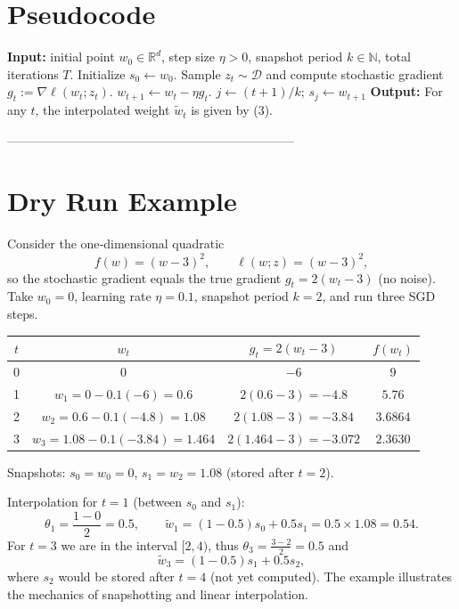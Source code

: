 \documentclass{article}
\newcommand{\R}{\mathbb{R}}
\begin{document}
\section*{Pseudocode}
\begin{algorithm}[H]
\caption{Stochastic Weight Interpolation (SWI)}
\begin{algorithmic}[1]
\STATE \textbf{Input:} initial point $w_0\in\R^d$, step size $\eta>0$, snapshot period $k\in\mathbb N$, total iterations $T$.
\STATE Initialize $s_0\gets w_0$.
    \STATE Sample $z_t\sim\mathcal D$ and compute stochastic gradient $g_t:=\nabla\ell(w_t;z_t)$.
    \STATE $w_{t+1}\gets w_t-\eta g_t$.
        \STATE $j\gets (t+1)/k$; \quad $s_j\gets w_{t+1}$ 
    \ENDIF
\ENDFOR
\STATE \textbf{Output:} For any $t$, the interpolated weight $\widetilde w_t$ is given by (3). 
\end{algorithmic}
\end{algorithm}

---------------------------------------------------------------------

\section*{Dry Run Example}
Consider the one‑dimensional quadratic 
\[
    f(w)=(w-3)^2, \qquad \ell(w;z)= (w-3)^2,
\]
so the stochastic gradient equals the true gradient $g_t=2(w_t-3)$ (no noise).  
Take $w_0=0$, learning rate $\eta=0.1$, snapshot period $k=2$, and run three SGD steps.

\begin{center}
\begin{tabular}{c|c|c|c}
$t$ & $w_t$ & $g_t=2(w_t-3)$ & $f(w_t)$ \\ \hline
0 & $0$ & $-6$ & $9$ \\
1 & $w_1=0-0.1(-6)=0.6$ & $2(0.6-3)=-4.8$ & $5.76$ \\
2 & $w_2=0.6-0.1(-4.8)=1.08$ & $2(1.08-3)=-3.84$ & $3.6864$ \\
3 & $w_3=1.08-0.1(-3.84)=1.464$ & $2(1.464-3)=-3.072$ & $2.3630$ \\
\end{tabular}
\end{center}

Snapshots: $s_0=w_0=0$, $s_1=w_2=1.08$ (stored after $t=2$).  

Interpolation for $t=1$ (between $s_0$ and $s_1$):
\[
\theta_1=\frac{1-0}{2}=0.5,\qquad 
\widetilde w_1= (1-0.5)s_0+0.5 s_1=0.5\times1.08=0.54.
\]
For $t=3$ we are in the interval $[2,4)$, thus $\theta_3=\frac{3-2}{2}=0.5$ and
\[
\widetilde w_3= (1-0.5)s_1+0.5 s_2,
\]
where $s_2$ would be stored after $t=4$ (not yet computed). The example illustrates the mechanics of snapshotting and linear interpolation.
\end{document}
